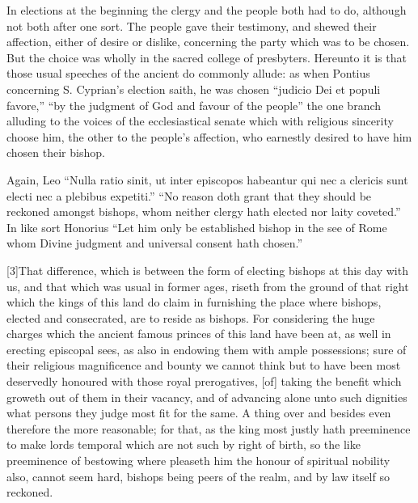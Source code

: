 In elections at the beginning the clergy and the people both had to do, although not both after one sort. The people gave their testimony, and shewed their affection, either of desire or dislike, concerning the party which was to be chosen. But the choice was wholly in the sacred college of presbyters. Hereunto it is that those usual speeches of the ancient do commonly allude: as when Pontius concerning S. Cyprian’s election saith, he was chosen “judicio Dei et populi favore,” “by the judgment of God and favour of the people” the one branch alluding to the voices of the ecclesiastical senate which with religious sincerity choose him, the other to the people’s affection, who earnestly desired to have him chosen their bishop.

Again, Leo “Nulla ratio sinit, ut inter episcopos habeantur qui nec a clericis sunt electi nec a plebibus expetiti.” “No reason doth grant that they should be reckoned amongst bishops, whom neither clergy hath elected nor laity coveted.” In like sort Honorius “Let him only be established bishop  in the see of Rome whom Divine judgment and universal consent hath chosen.”

[3]That difference, which is between the form of electing bishops at this day with us, and that which was usual in former ages, riseth from the ground of that right which the kings of this land do claim in furnishing the place where bishops, elected and consecrated, are to reside as bishops. For considering the huge charges which the ancient famous princes of this land have been at, as well in erecting episcopal sees, as also in endowing them with ample possessions; sure of their religious magnificence and bounty we cannot think but to have been most deservedly honoured with those royal prerogatives, [of] taking the benefit which groweth out of them in their vacancy, and of advancing alone unto such dignities what persons they judge most fit for the same. A thing over and besides even therefore the more reasonable; for that, as the king most justly hath preeminence to make lords temporal which are not such by right of birth, so the like preeminence of bestowing where pleaseth him the honour of spiritual nobility also, cannot seem hard, bishops being peers of the realm, and by law itself so reckoned.

